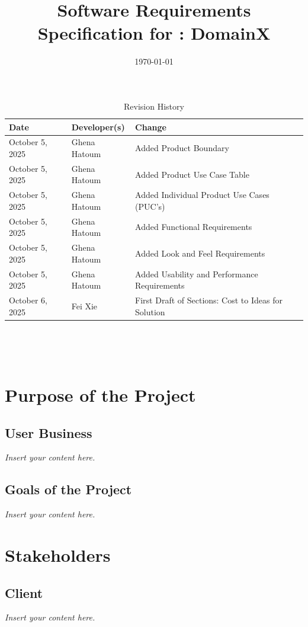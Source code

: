 \documentclass[12pt]{article}
\newcommand{\lips}{\textit{Insert your content here.}}
\begin{document}
\title{Software Requirements Specification for \progname: DomainX} 
\author{\authname}
\date{\today}
	
\maketitle

\begin{table}[hp]
\caption{Revision History} \label{TblRevisionHistory}
\begin{tabularx}{\textwidth}{llX}
\toprule
\textbf{Date} & \textbf{Developer(s)} & \textbf{Change}\\
\midrule
October 5, 2025 & Ghena Hatoum & Added Product Boundary \\
October 5, 2025 & Ghena Hatoum & Added Product Use Case Table \\
October 5, 2025 & Ghena Hatoum & Added Individual Product Use Cases (PUC's) \\
October 5, 2025 & Ghena Hatoum & Added Functional Requirements \\
October 5, 2025 & Ghena Hatoum & Added Look and Feel Requirements \\
October 5, 2025 & Ghena Hatoum & Added Usability and Performance Requirements \\
October 6, 2025 & Fei Xie & First Draft of Sections: Cost to Ideas for Solution\\
\bottomrule
\end{tabularx}
\end{table}

~\newpage

\tableofcontents

~\newpage
\section{Purpose of the Project}
\subsection{User Business}
\lips
\subsection{Goals of the Project}
\lips
\section{Stakeholders}
\subsection{Client}
\lips
\end{document}
